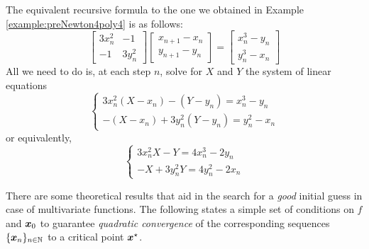 \begin{example}
The equivalent recursive formula to the one we obtained in Example \ref{example:preNewton4poly4} is as follows:
\begin{equation*}
\begin{bmatrix} 3x_n^2 & -1 \\ -1 & 3y_n^2 \end{bmatrix} \begin{bmatrix} x_{n+1}-x_n \\ y_{n+1}-y_n \end{bmatrix} = \begin{bmatrix} x_n^3 - y_n \\ y_n^3 - x_n \end{bmatrix}
\end{equation*}
All we need to do is, at each step $n$, solve for $X$ and $Y$ the system of linear equations
\begin{equation*}
\begin{cases}
3x_n^2 (X-x_n) - (Y-y_n)  = x_n^3 - y_n \\
-(X-x_n) + 3y_n^2 (Y-y_n) = y_n^2 - x_n
\end{cases}
\end{equation*}
or equivalently,
\begin{equation*}
\begin{cases}
3x_n^2 X - Y = 4x_n^3 - 2y_n \\
-X + 3y_n^2 Y = 4y_n^2 - 2x_n
\end{cases}
\end{equation*}
\end{example}

\separator

There are some theoretical results that aid in the search for a \emph{good} initial guess in case of multivariate functions.  The following states a simple set of conditions on $f$ and $\boldsymbol{x}_0$ to guarantee \emph{quadratic convergence} of the corresponding sequences $\{ \boldsymbol{x}_n \}_{n \in \mathbb{N}}$ to a critical point $\boldsymbol{x}^{\star}$.

